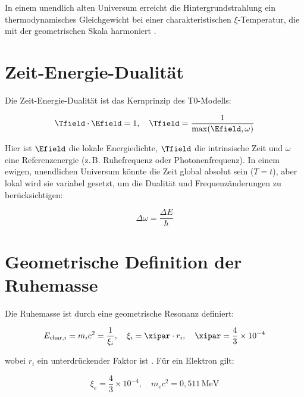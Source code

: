 In einem unendlich alten Universum erreicht die Hintergrundstrahlung ein thermodynamisches Gleichgewicht bei einer charakteristischen \(\xi\)-Temperatur, die mit der geometrischen Skala harmoniert \cite{pascher_t0_cmb_2025}.

\section{Zeit-Energie-Dualität}
\label{sec:zeit_energie_dualitaet}

Die Zeit-Energie-Dualität ist das Kernprinzip des T0-Modells:

\begin{equation}
	\Tfield \cdot \Efield = 1, \quad \Tfield = \frac{1}{\max(\Efield, \omega)}
	\label{eq:zeit_energie_dualitaet}
\end{equation}

Hier ist \(\Efield\) die lokale Energiedichte, \(\Tfield\) die intrinsische Zeit und \(\omega\) eine Referenzenergie (z.\,B. Ruhefrequenz oder Photonenfrequenz). In einem ewigen, unendlichen Universum könnte die Zeit global absolut sein (\( T = t \)), aber lokal wird sie variabel gesetzt, um die Dualität und Frequenzänderungen zu berücksichtigen:

\begin{equation}
	\Delta \omega = \frac{\Delta E}{\hbar}
	\label{eq:frequenz_aenderung}
\end{equation}

\section{Geometrische Definition der Ruhemasse}
\label{sec:geometrische_ruhemasse}

Die Ruhemasse ist durch eine geometrische Resonanz definiert:

\begin{equation}
	E_{\text{char},i} = m_i c^2 = \frac{1}{\xi_i}, \quad \xi_i = \xipar \cdot r_i, \quad \xipar = \frac{4}{3} \times 10^{-4}
	\label{eq:ruhemasse_definition}
\end{equation}

wobei \(r_i\) ein unterdrückender Faktor ist \cite{pascher_t0_energie_2025}. Für ein Elektron gilt:

\begin{equation}
	\xi_e = \frac{4}{3} \times 10^{-4}, \quad m_e c^2 = 0{,}511 \, \text{MeV}
	\label{eq:elektron_energie}
\end{equation}

